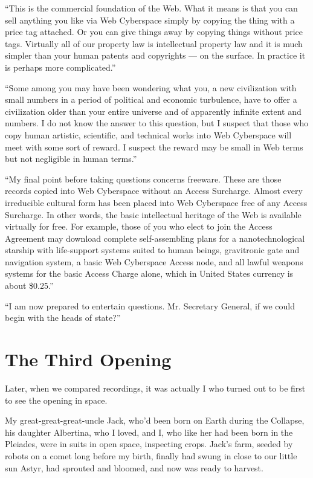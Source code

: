 \documentclass[english,11pt,letterpaper,onecolumn]{scrbook}
\begin{document}
	``This is the commercial foundation of the Web.  What it means is that you can sell anything you like via Web Cyberspace simply by copying the thing with a price tag attached.  Or you can give things away by copying things without price tags.  Virtually all of our property law is intellectual property law and it is much simpler than your human patents and copyrights --- on the surface.  In practice it is perhaps more complicated.''
	
	``Some among you may have been wondering what you, a new civilization with small numbers in a period of political and economic turbulence, have to offer a civilization older than your entire universe and of apparently infinite extent and numbers.  I do not know the answer to this question, but I suspect that those who copy human artistic, scientific, and technical works into Web Cyberspace will meet with some sort of reward.  I suspect the reward may be small in Web terms but not negligible in human terms.''
	
	``My final point before taking questions concerns freeware.  These are those records copied into Web Cyberspace without an Access Surcharge.  Almost every irreducible cultural form has been placed into Web Cyberspace free of any Access Surcharge.  In other words, the basic intellectual heritage of the Web is available virtually for free.  For example, those of you who elect to join the Access Agreement may download complete self-assembling plans for a nanotechnological starship with life-support systems suited to human beings, gravitronic gate and navigation system, a basic Web Cyberspace Access node, and all lawful weapons systems for the basic Access Charge alone, which in United States currency is about \$0.25.''
	
	``I am now prepared to entertain questions.  Mr. Secretary General, if we could begin with the heads of state?''
	
\chapter{The Third Opening}

	Later, when we compared recordings, it was actually I who turned out to be first to see the opening in space.

	My great-great-great-uncle Jack, who'd been born on Earth during the Collapse, his daughter Albertina, who I loved, and I, who like her had been born in the Pleiades, were in suits in open space, inspecting crops.  Jack's farm, seeded by robots on a comet long before my birth, finally had swung in close to our little sun Astyr, had sprouted and bloomed, and now was ready to harvest.  
\end{document}
